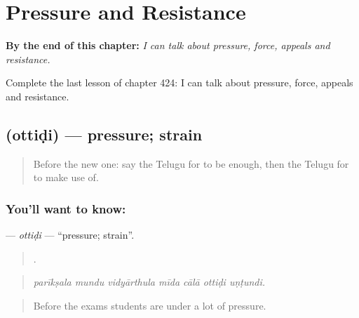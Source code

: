 
\chapter{Pressure and Resistance}
\label{ch:te-pressure-and-resistance}

\begin{chapteropening}
\textbf{By the end of this chapter:} \emph{I can talk about pressure, force, appeals and resistance.}

Complete the last lesson of chapter 424: I can talk about pressure, force, appeals and resistance.
\end{chapteropening}

\section[\texorpdfstring{\te{ఒత్తిడి} (ottiḍi)}{ఒత్తిడి (ottiḍi)}]{ (ottiḍi) — pressure; strain}

\label{lesson:TE-C424-ottidi}



\begin{quote}
Before the new one: say the Telugu for to be enough, then the Telugu for to make use of.
\end{quote}

\subsection*{You'll want to know: }
\textbf{} — \emph{ottiḍi} — \textquotedblleft{}pressure; strain\textquotedblright{}.

\begin{quote}
      .
\end{quote}

\begin{quote}
\emph{parīkṣala mundu vidyārthula mīda cālā ottiḍi uṇṭundi.}
\end{quote}

\begin{quote}
Before the exams students are under a lot of pressure.
\end{quote}

